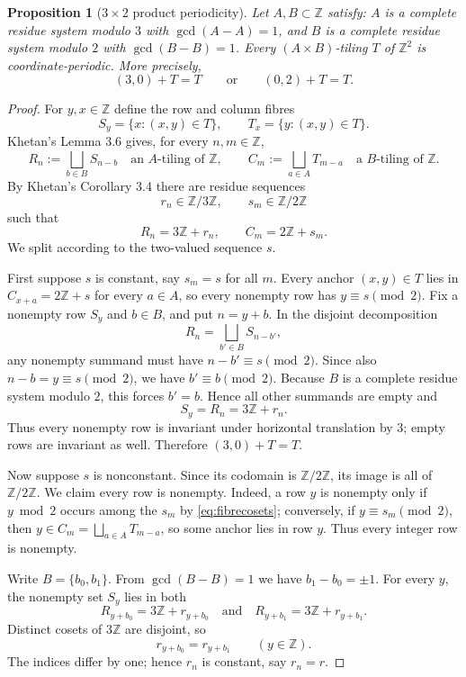 \documentclass[11pt]{article}
\newtheorem{proposition}[theorem]{Proposition}
\newcommand{\Z}{\mathbb Z}
\begin{document}
\begin{proposition}[$3\times2$ product periodicity]\label{prop:32}
Let $A,B\subset\Z$ satisfy: $A$ is a complete residue system modulo $3$ with $\gcd(A-A)=1$, and $B$ is a complete residue system modulo $2$ with $\gcd(B-B)=1$. Every $(A\times B)$-tiling $T$ of $\Z^2$ is coordinate-periodic. More precisely,
\[
 (3,0)+T=T\qquad\text{or}\qquad(0,2)+T=T.
\]
\end{proposition}
\begin{proof}
For $y,x\in\Z$ define the row and column fibres
\[
 S_y=\{x:(x,y)\in T\},\qquad T_x=\{y:(x,y)\in T\}.
\]
Khetan's Lemma 3.6 gives, for every $n,m\in\Z$,
\[
 R_n:=\bigsqcup_{b\in B}S_{n-b}\quad\text{an $A$-tiling of $\Z$},
\qquad
 C_m:=\bigsqcup_{a\in A}T_{m-a}\quad\text{a $B$-tiling of $\Z$}.
\]
By Khetan's Corollary 3.4 there are residue sequences
\[
 r_n\in\Z/3\Z,\qquad s_m\in\Z/2\Z
\]
such that
\begin{equation}\label{eq:fibrecosets}
 R_n=3\Z+r_n,\qquad C_m=2\Z+s_m.
\end{equation}
We split according to the two-valued sequence $s$.

First suppose $s$ is constant, say $s_m=s$ for all $m$. Every anchor $(x,y)\in T$ lies in $C_{x+a}=2\Z+s$ for every $a\in A$, so every nonempty row has $y\equiv s\pmod2$. Fix a nonempty row $S_y$ and $b\in B$, and put $n=y+b$. In the disjoint decomposition
\[
 R_n=\bigsqcup_{b'\in B}S_{n-b'},
\]
any nonempty summand must have $n-b'\equiv s\pmod2$. Since also $n-b=y\equiv s\pmod2$, we have $b'\equiv b\pmod2$. Because $B$ is a complete residue system modulo $2$, this forces $b'=b$. Hence all other summands are empty and
\[
 S_y=R_n=3\Z+r_n.
\]
Thus every nonempty row is invariant under horizontal translation by $3$; empty rows are invariant as well. Therefore $(3,0)+T=T$.

Now suppose $s$ is nonconstant. Since its codomain is $\Z/2\Z$, its image is all of $\Z/2\Z$. We claim every row is nonempty. Indeed, a row $y$ is nonempty only if $y\bmod2$ occurs among the $s_m$ by \eqref{eq:fibrecosets}; conversely, if $y\equiv s_m\pmod2$, then $y\in C_m=\bigsqcup_{a\in A}T_{m-a}$, so some anchor lies in row $y$. Thus every integer row is nonempty.

Write $B=\{b_0,b_1\}$. From $\gcd(B-B)=1$ we have $b_1-b_0=\pm1$. For every $y$, the nonempty set $S_y$ lies in both
\[
 R_{y+b_0}=3\Z+r_{y+b_0}
 \quad\text{and}\quad
 R_{y+b_1}=3\Z+r_{y+b_1}.
\]
Distinct cosets of $3\Z$ are disjoint, so
\[
 r_{y+b_0}=r_{y+b_1}\qquad(y\in\Z).
\]
The indices differ by one; hence $r_n$ is constant, say $r_n=r$.


\end{proof}
\end{document}
